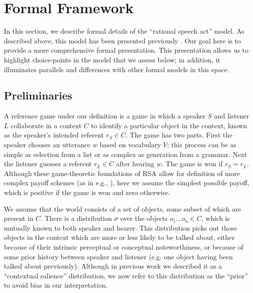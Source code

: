 \documentclass[man,noapacite]{apa2}
\begin{document}
\section{Formal Framework} \label{sec:models-intro}

In this section, we describe formal details of the ``rational speech act'' model. As described above, this model has been presented previously \cite{frank2012,goodman2013}. Our goal here is to provide a more comprehensive formal presentation. This presentation allows us to highlight choice-points in the model that we assess below; in addition, it illuminates parallels and differences with other formal models in this space.



\subsection{Preliminaries}

A reference game under our definition is a game in which a speaker $S$ and listener $L$ collaborate in a context $C$ to identify a particular object in the context, known as the speaker's intended referent $r_S \in C$. The game has two parts. First the speaker chooses an utterance $w$ based on vocabulary $V$; this process can be as simple as selection from a list or as complex as generation from a grammar. Next the listener guesses a referent $r_L \in C$ after hearing $w$. The game is won if $r_S=r_L$. Although these game-theoretic foundations of RSA allow for definition of more complex payoff schemes (as in e.g., ), here we assume the simplest possible payoff, which is positive if the game is won and zero otherwise.

We assume that the world consists of a set of objects, some subset of which are present in $C$. There is a distribution $\sigma$ over the objects ${o_1 ... o_n} \in C$, which is mutually known to both speaker and hearer. This distribution picks out those objects in the context which are more or less likely to be talked about, either because of their intrinsic perceptual or conceptual noteworthiness, or because of some prior history between speaker and listener (e.g. one object having been talked about previously). Although in previous work we described it as a ``contextual salience'' distribution, we now refer to this distribution as the ``prior'' to avoid bias in our interpretation.
\end{document}
